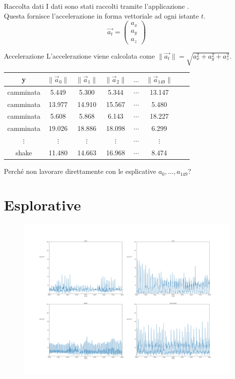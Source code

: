 \documentclass{beamer}
\begin{document}
\begin{frame}{Raccolta dati}
I dati sono stati raccolti tramite l'applicazione \cite{kumarPhonePiSampleServer2019}.\\
\smallskip
Questa fornisce l'accelerazione in forma vettoriale ad ogni istante $t$.
\[
\vec{a_t} = \begin{pmatrix}
a_x \\ a_y \\ a_z
\end{pmatrix}
\]
\end{frame}

\begin{frame}{Accelerazione}
L'accelerazione viene calcolata come $\|\vec{a_t}\| =\sqrt{a_x^2+a_y^2+a_z^2}$.
\begin{table}[H]
\begin{tabular}{cccccccc}
\toprule
y & $\|\vec{a}_0\|$ & $\|\vec{a}_1\|$ & $\|\vec{a}_2\|$  & $\dots$ & $\|\vec{a}_{149}\|$\\
\midrule
camminata & 5.449 & 5.300 & 5.344 &  $\cdots$ & 13.147\\
camminata & 13.977 & 14.910 & 15.567 &  $\cdots$ & 5.480\\
camminata & 5.608 & 5.868 & 6.143 &  $\cdots$ & 18.227\\
camminata & 19.026 & 18.886 & 18.098 &  $\cdots$ & 6.299\\
$\vdots$ & $\vdots$ & $\vdots$ & $\vdots$ &  $\cdots$ & $\vdots$\\
shake & 11.480 & 14.663 & 16.968 &  $\cdots$ & 8.474\\

\bottomrule
\end{tabular}
\end{table}
Perché non lavorare direttamente con le esplicative $a_0,\dots,a_{149}$?
\end{frame}

\section{Esplorative}
\begin{frame}
\begin{figure}[H]
\includegraphics[width=\textwidth]{../figure/espl.png}
\end{figure}
\end{frame}
\end{document}
